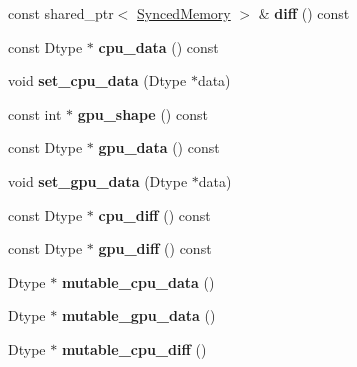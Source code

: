 \begin{DoxyCompactItemize}
\mbox{\label{classcaffe_1_1_blob_a5c5eced39d7bb4a41dd6f0fb1504a48e}} 
const shared\+\_\+ptr$<$ \mbox{\hyperlink{classcaffe_1_1_synced_memory}{Synced\+Memory}} $>$ \& {\bfseries diff} () const
\item 
\mbox{\label{classcaffe_1_1_blob_a424c5d57df666249906bff01435b5f66}} 
const Dtype $\ast$ {\bfseries cpu\+\_\+data} () const
\item 
\mbox{\label{classcaffe_1_1_blob_a5d7d38b157e43ff6a8b8bf94b6815daf}} 
void {\bfseries set\+\_\+cpu\+\_\+data} (Dtype $\ast$data)
\item 
\mbox{\label{classcaffe_1_1_blob_ae505e5286e26e9493d99d177f7533e5a}} 
const int $\ast$ {\bfseries gpu\+\_\+shape} () const
\item 
\mbox{\label{classcaffe_1_1_blob_a65edecf195c052a6c92da8e4c01518d1}} 
const Dtype $\ast$ {\bfseries gpu\+\_\+data} () const
\item 
\mbox{\label{classcaffe_1_1_blob_ad350de479e172e963f02e8332c800bb7}} 
void {\bfseries set\+\_\+gpu\+\_\+data} (Dtype $\ast$data)
\item 
\mbox{\label{classcaffe_1_1_blob_a136f86cd4557e307c43f330ca13db406}} 
const Dtype $\ast$ {\bfseries cpu\+\_\+diff} () const
\item 
\mbox{\label{classcaffe_1_1_blob_a14c3cfda68a4ca931aa05941289ffb22}} 
const Dtype $\ast$ {\bfseries gpu\+\_\+diff} () const
\item 
\mbox{\label{classcaffe_1_1_blob_ac170c040c34e2e78e7fc0d2ee12cf0ef}} 
Dtype $\ast$ {\bfseries mutable\+\_\+cpu\+\_\+data} ()
\item 
\mbox{\label{classcaffe_1_1_blob_abac6bde0521e019df173213af6808e3b}} 
Dtype $\ast$ {\bfseries mutable\+\_\+gpu\+\_\+data} ()
\item 
\mbox{\label{classcaffe_1_1_blob_a4eb870499aa659a5eee7af622cd92eca}} 
Dtype $\ast$ {\bfseries mutable\+\_\+cpu\+\_\+diff} ()

\end{DoxyCompactItemize}
